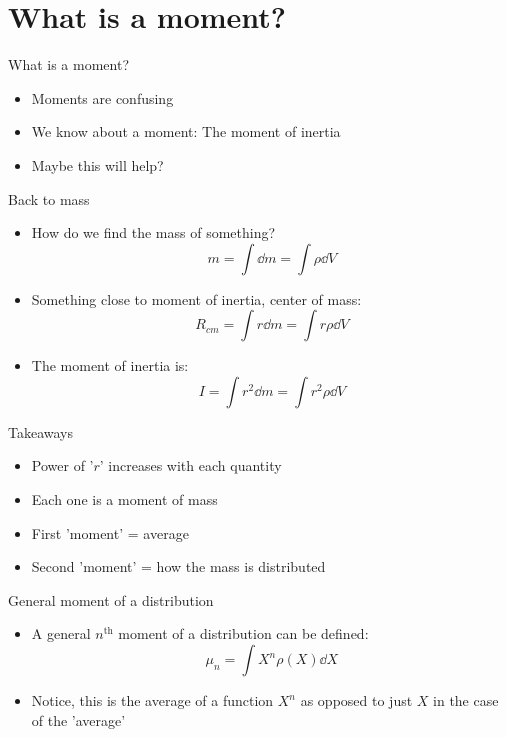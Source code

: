 \documentclass{beamer}
\begin{document}
\section{What is a moment?}
\begin{frame}{What is a moment?}
  \begin{itemize}
  \item Moments are confusing
  \item We know about a moment: The moment of inertia
  \item Maybe this will help?
  \end{itemize}
\end{frame}
\begin{frame}{Back to mass}
  \begin{itemize}
  \item How do we find the mass of something? \pause
    \begin{equation}
      m = \int\dd{m} = \int \rho\dd{V}
    \end{equation}\pause
  \item Something close to moment of inertia, center of mass: \pause
    \begin{equation}
      R_{cm} = \int r\dd{m} = \int r\rho\dd{V}
    \end{equation}\pause
  \item The moment of inertia is:\pause
    \begin{equation}
      I = \int r^2\dd{m} = \int r^2\rho\dd{V}
    \end{equation}
  \end{itemize}
\end{frame}
\begin{frame}{Takeaways}
  \begin{itemize}
  \item Power of '$r$' increases with each quantity
  \item Each one is a moment of mass
  \item First 'moment' = average
  \item Second 'moment' = how the mass is distributed
  \end{itemize}
\end{frame}
\begin{frame}{General moment of a distribution}
  \begin{itemize}
  \item A general $n^{\text{th}}$ moment of a distribution can be defined:
    \begin{equation}
      \mu_n=\int X^n\rho(X)\dd{X}
    \end{equation}
  \item Notice, this is the average of a function $X^n$ as opposed to just $X$ in the case of the 'average'
  \end{itemize}
\end{frame}
\end{document}
